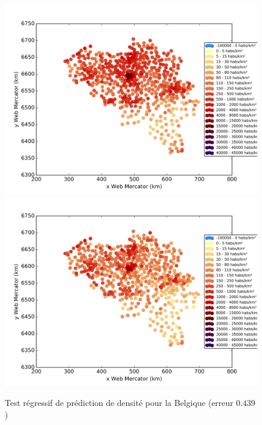 \documentclass{book}
\begin{document}
\begin{figure}[H]
\begin{center}
\includegraphics[scale=0.5]{images/belgique_ground_truth.png}
\includegraphics[scale=0.5]{images/belgique_Random_Forest_Regression.png}
\end{center}
\caption{Test régressif de prédiction de densité pour la Belgique (erreur $0.439$)}
\label{test_belgique}
\end{figure}
\end{document}
